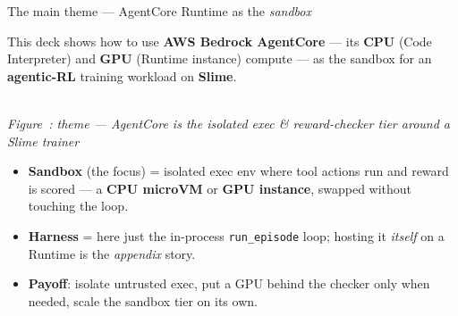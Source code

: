 \documentclass[aspectratio=169]{beamer}
\newcounter{deckfig}
\newcommand{\figtag}[1]{\refstepcounter{deckfig}%
  {\scriptsize\itshape Figure~\thedeckfig: #1}}
\begin{document}
\begin{frame}{The main theme --- AgentCore Runtime as the \emph{sandbox}}
  \begin{center}
  {\large This deck shows how to use \textbf{AWS Bedrock AgentCore} --- its \textbf{CPU}
  (Code Interpreter) and \textbf{GPU} (Runtime instance) compute --- as the \alert{sandbox}
  for an \textbf{agentic-RL} training workload on \textbf{Slime}.}
  \end{center}
  \begin{center}
  \\[0.15em]\figtag{theme --- AgentCore is the isolated exec \& reward-checker tier around a Slime trainer}
  \end{center}
  \vspace{-0.1em}
  \footnotesize
  \begin{itemize}\setlength\itemsep{0.03em}
    \item \textbf{Sandbox} (the focus) = isolated exec env where tool actions run and reward is scored --- a \textbf{CPU microVM} or \textbf{GPU instance}, swapped without touching the loop.
    \item \textbf{Harness} = here just the in-process \texttt{run\_episode} loop; hosting it \emph{itself} on a Runtime is the \emph{appendix} story.
    \item \textbf{Payoff}: isolate untrusted exec, put a GPU behind the checker only when needed, scale the sandbox tier on its own.
  \end{itemize}
\end{frame}
\end{document}
